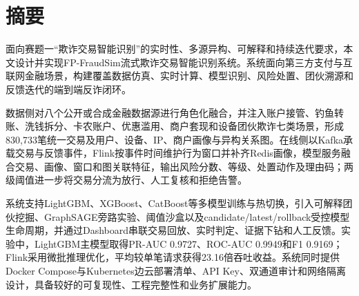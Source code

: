 \section*{\centering\heiti{}摘\quad 要}

\vspace{0.35cm}

\begingroup
{}
{
面向赛题一“欺诈交易智能识别”的实时性、多源异构、可解释和持续迭代要求，本文设计并实现FP-FraudSim流式欺诈交易智能识别系统。系统面向第三方支付与互联网金融场景，构建覆盖数据仿真、实时计算、模型识别、风险处置、团伙溯源和反馈迭代的端到端反诈闭环。

数据侧对八个公开或合成金融数据源进行角色化融合，并注入账户接管、钓鱼转账、洗钱拆分、卡农账户、优惠滥用、商户套现和设备团伙欺诈七类场景，形成830,733笔统一交易及用户、设备、IP、商户画像与异构关系图。在线侧以Kafka承载交易与反馈事件，Flink按事件时间维护行为窗口并补齐Redis画像，模型服务融合交易、画像、窗口和图关联特征，输出风险分数、等级、处置动作及理由码；两级阈值进一步将交易分流为放行、人工复核和拒绝告警。

系统支持LightGBM、XGBoost、CatBoost等多模型训练与热切换，引入可解释团伙挖掘、GraphSAGE旁路实验、阈值沙盒以及candidate/latest/rollback受控模型生命周期，并通过Dashboard串联交易回放、实时判定、证据下钻和人工反馈。实验中，LightGBM主模型取得PR-AUC 0.9727、ROC-AUC 0.9949和F1 0.9169；Flink采用微批推理优化，平均较单笔请求获得23.16倍吞吐收益。系统同时提供Docker Compose与Kubernetes边云部署清单、API Key、双通道审计和网络隔离设计，具备较好的可复现性、工程完整性和业务扩展能力。
}

\vspace{0.45cm}

\endgroup
